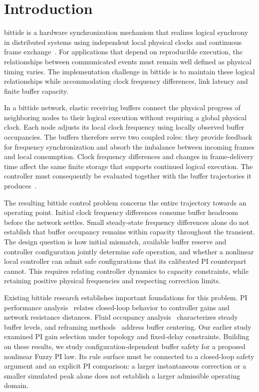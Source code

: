 \section{Introduction}
\label{sec:introduction}

bittide is a hardware synchronization mechanism that realizes logical synchrony in distributed systems using independent local physical clocks and continuous frame exchange~\cite{lall2024logicalSynchrony}. For applications that depend on reproducible execution, the relationships between communicated events must remain well defined as physical timing varies. The implementation challenge in bittide is to maintain these logical relationships while accommodating clock frequency differences, link latency and finite buffer capacity.

In a bittide network, elastic receiving buffers connect the physical progress of neighboring nodes to their logical execution without requiring a global physical clock. Each node adjusts its local clock frequency using locally observed buffer occupancies. The buffers therefore serve two coupled roles: they provide feedback for frequency synchronization and absorb the imbalance between incoming frames and local consumption. Clock frequency differences and changes in frame-delivery time affect the same finite storage that supports continued logical execution. The controller must consequently be evaluated together with the buffer trajectories it produces~\cite{lall2024logicalSynchrony}.

The resulting bittide control problem concerns the entire trajectory towards an operating point. Initial clock frequency differences consume buffer headroom before the network settles. Small steady-state frequency differences alone do not establish that buffer occupancy remains within capacity throughout the transient. The design question is how initial mismatch, available buffer reserve and controller configuration jointly determine safe operation, and whether a nonlinear local controller can admit safe configurations that its calibrated PI counterpart cannot. This requires relating controller dynamics to capacity constraints, while retaining positive physical frequencies and respecting correction limits.

Existing bittide research establishes important foundations for this problem. PI performance analysis~\cite{lall2022resistance} relates closed-loop behavior to controller gains and network resistance distances. Fluid occupancy analysis~\cite{lall2024bufferOccupancy} characterizes steady buffer levels, and reframing methods~\cite{lall2023bufferCentering} address buffer centering. Our earlier study examined PI gain selection under topology and fixed-delay constraints. Building on these results, we study configuration-dependent buffer safety for a proposed nonlinear Fuzzy PI law. Its rule surface must be connected to a closed-loop safety argument and an explicit PI comparison: a larger instantaneous correction or a smaller simulated peak alone does not establish a larger admissible operating domain.

